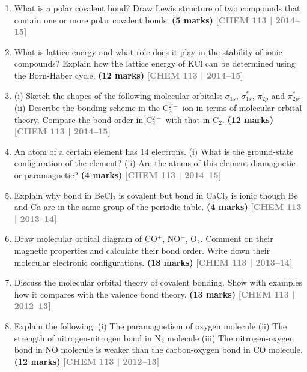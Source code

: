\documentclass[12pt,a3paper]{article}
\newcommand{\yr}[1]{\hfill\textcolor{gray}{\small\textbf{[#1]}}}
\newcommand{\mk}[1]{\textcolor{orange!70!black}{\small\textbf{(#1 marks)}}}
\begin{document}
\begin{enumerate}
\item What is a polar covalent bond? Draw Lewis structure of two compounds that contain one or more polar covalent bonds. \mk{5}
\yr{CHEM 113 | 2014--15}




\item What is lattice energy and what role does it play in the stability of ionic compounds? Explain how the lattice energy of KCl can be determined using the Born-Haber cycle. \mk{12}
\yr{CHEM 113 | 2014--15}



\item (i) Sketch the shapes of the following molecular orbitals: $\sigma_{1s}$, $\sigma^*_{1s}$, $\pi_{2p}$ and $\pi^*_{2p}$. (ii) Describe the bonding scheme in the C$_2^{2-}$ ion in terms of molecular orbital theory. Compare the bond order in C$_2^{2-}$ with that in C$_2$. \mk{12}
\yr{CHEM 113 | 2014--15}



\item An atom of a certain element has 14 electrons. (i) What is the ground-state configuration of the element? (ii) Are the atoms of this element diamagnetic or paramagnetic? \mk{4}
\yr{CHEM 113 | 2014--15}



\item Explain why bond in BeCl$_2$ is covalent but bond in CaCl$_2$ is ionic though Be and Ca are in the same group of the periodic table. \mk{4}
\yr{CHEM 113 | 2013--14}



\item Draw molecular orbital diagram of CO$^+$, NO$^-$, O$_2$. Comment on their magnetic properties and calculate their bond order. Write down their molecular electronic configurations. \mk{18}
\yr{CHEM 113 | 2013--14}



  \item Discuss the molecular orbital theory of covalent bonding. Show with examples how it compares with the valence bond theory. \mk{13}
\yr{CHEM 113 | 2012--13}



\item Explain the following: (i) The paramagnetism of oxygen molecule (ii) The strength of nitrogen-nitrogen bond in N$_2$ molecule (iii) The nitrogen-oxygen bond in NO molecule is weaker than the carbon-oxygen bond in CO molecule. \mk{12}
\yr{CHEM 113 | 2012--13}




\end{enumerate}
\end{document}
